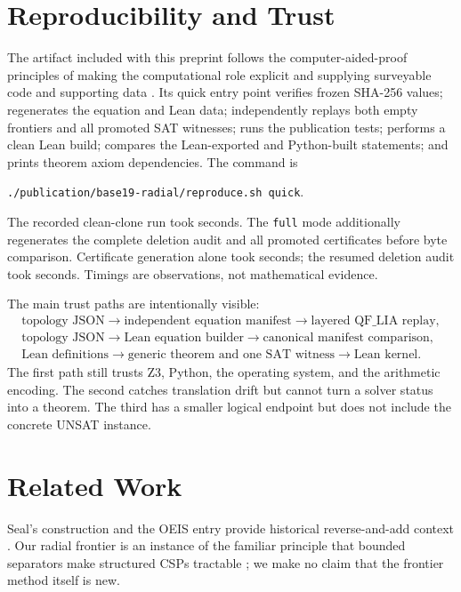 \documentclass[11pt]{article}
\begin{document}
\section{Reproducibility and Trust}

The artifact included with this preprint follows the computer-aided-proof
principles of making the computational role explicit and supplying
surveyable code and supporting data \cite{lmsComputerAidedProofs}.  Its quick
entry point verifies frozen SHA-256 values; regenerates the equation and Lean
data; independently replays both empty frontiers and all promoted SAT
witnesses; runs the publication tests; performs a clean Lean build; compares
the Lean-exported and Python-built statements; and prints theorem axiom
dependencies.  The command is
\begin{center}
\texttt{./publication/base19-radial/reproduce.sh quick}.
\end{center}
The recorded clean-clone run took \CleanCloneSeconds{} seconds.  The
\texttt{full} mode additionally regenerates the complete deletion audit and
all promoted certificates before byte comparison.  Certificate generation
alone took \CertificateGenerationSeconds{} seconds; the resumed deletion
audit took \DeletionAuditSeconds{} seconds.  Timings are observations, not
mathematical evidence.

The main trust paths are intentionally visible:
\[
\begin{array}{c}
\text{topology JSON}\longrightarrow\text{independent equation manifest}
\longrightarrow\text{layered QF\_LIA replay},\\[2mm]
\text{topology JSON}\longrightarrow\text{Lean equation builder}
\longrightarrow\text{canonical manifest comparison},\\[2mm]
\text{Lean definitions}\longrightarrow\text{generic theorem and one SAT witness}
\longrightarrow\text{Lean kernel}.
\end{array}
\]
The first path still trusts Z3, Python, the operating system, and the
arithmetic encoding.  The second catches translation drift but cannot turn a
solver status into a theorem.  The third has a smaller logical endpoint but
does not include the concrete UNSAT instance.

\section{Related Work}

Seal's construction and the OEIS entry provide historical reverse-and-add
context \cite{brownSeal,oeisA060382}.  Our radial frontier is an instance of
the familiar principle that bounded separators make structured CSPs
tractable \cite{Freuder1990,DechterPearl1989}; we make no claim that the
frontier method itself is new.
\end{document}
